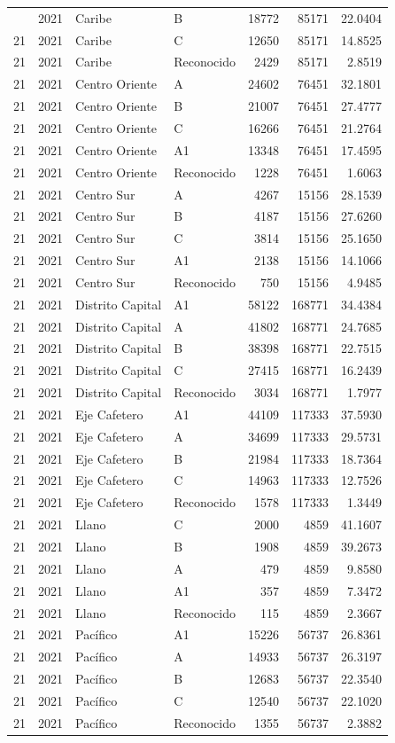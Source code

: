 \begin{longtable}{rrllrrr}
{{21 & 2021 & Caribe & B & 18772 & 85171 & 22.0404 \\
21 & 2021 & Caribe & C & 12650 & 85171 & 14.8525 \\
21 & 2021 & Caribe & Reconocido & 2429 & 85171 & 2.8519 \\
21 & 2021 & Centro Oriente & A & 24602 & 76451 & 32.1801 \\
21 & 2021 & Centro Oriente & B & 21007 & 76451 & 27.4777 \\
21 & 2021 & Centro Oriente & C & 16266 & 76451 & 21.2764 \\
21 & 2021 & Centro Oriente & A1 & 13348 & 76451 & 17.4595 \\
21 & 2021 & Centro Oriente & Reconocido & 1228 & 76451 & 1.6063 \\
21 & 2021 & Centro Sur & A & 4267 & 15156 & 28.1539 \\
21 & 2021 & Centro Sur & B & 4187 & 15156 & 27.6260 \\
21 & 2021 & Centro Sur & C & 3814 & 15156 & 25.1650 \\
21 & 2021 & Centro Sur & A1 & 2138 & 15156 & 14.1066 \\
21 & 2021 & Centro Sur & Reconocido & 750 & 15156 & 4.9485 \\
21 & 2021 & Distrito Capital & A1 & 58122 & 168771 & 34.4384 \\
21 & 2021 & Distrito Capital & A & 41802 & 168771 & 24.7685 \\
21 & 2021 & Distrito Capital & B & 38398 & 168771 & 22.7515 \\
21 & 2021 & Distrito Capital & C & 27415 & 168771 & 16.2439 \\
21 & 2021 & Distrito Capital & Reconocido & 3034 & 168771 & 1.7977 \\
21 & 2021 & Eje Cafetero & A1 & 44109 & 117333 & 37.5930 \\
21 & 2021 & Eje Cafetero & A & 34699 & 117333 & 29.5731 \\
21 & 2021 & Eje Cafetero & B & 21984 & 117333 & 18.7364 \\
21 & 2021 & Eje Cafetero & C & 14963 & 117333 & 12.7526 \\
21 & 2021 & Eje Cafetero & Reconocido & 1578 & 117333 & 1.3449 \\
21 & 2021 & Llano & C & 2000 & 4859 & 41.1607 \\
21 & 2021 & Llano & B & 1908 & 4859 & 39.2673 \\
21 & 2021 & Llano & A & 479 & 4859 & 9.8580 \\
21 & 2021 & Llano & A1 & 357 & 4859 & 7.3472 \\
21 & 2021 & Llano & Reconocido & 115 & 4859 & 2.3667 \\
21 & 2021 & Pacífico & A1 & 15226 & 56737 & 26.8361 \\
21 & 2021 & Pacífico & A & 14933 & 56737 & 26.3197 \\
21 & 2021 & Pacífico & B & 12683 & 56737 & 22.3540 \\
21 & 2021 & Pacífico & C & 12540 & 56737 & 22.1020 \\
21 & 2021 & Pacífico & Reconocido & 1355 & 56737 & 2.3882 \\
\end{longtable}
